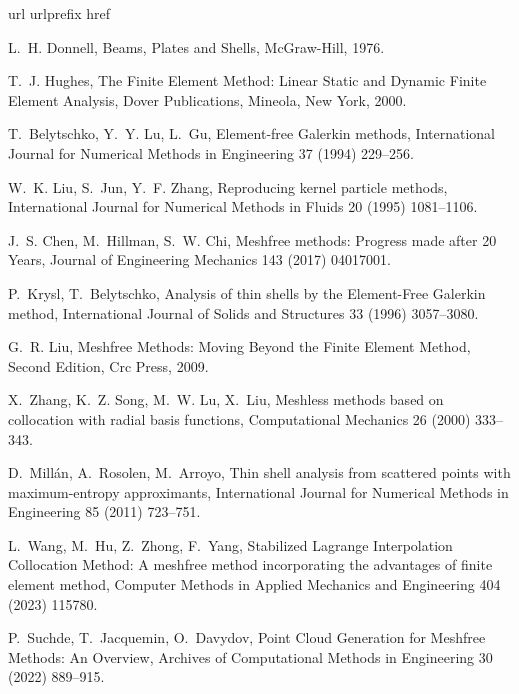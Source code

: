 \documentclass{elsarticle}
\begin{document}
\begin{thebibliography}{10}
\expandafter\ifx\csname url\endcsname\relax
  \def\url#1{\texttt{#1}}\fi
\expandafter\ifx\csname urlprefix\endcsname\relax\def\urlprefix{URL }\fi
\expandafter\ifx\csname href\endcsname\relax
  \def\href#1#2{#2} \def\path#1{#1}\fi

L.~H. Donnell, Beams, {{Plates}} and {{Shells}}, McGraw-Hill, 1976.

T.~J. Hughes, The {{Finite Element Method}}: {{Linear Static}} and {{Dynamic Finite Element Analysis}}, Dover Publications, Mineola, New York, 2000.

T.~Belytschko, Y.~Y. Lu, L.~Gu, Element-free {{Galerkin}} methods, International Journal for Numerical Methods in Engineering 37 (1994) 229--256.

W.~K. Liu, S.~Jun, Y.~F. Zhang, Reproducing kernel particle methods, International Journal for Numerical Methods in Fluids 20 (1995) 1081--1106.

J.~S. Chen, M.~Hillman, S.~W. Chi, {Meshfree methods: Progress made after 20 Years}, Journal of Engineering Mechanics 143 (2017) 04017001.

P.~Krysl, T.~Belytschko, Analysis of thin shells by the {{Element-Free Galerkin}} method, International Journal of Solids and Structures 33 (1996) 3057--3080.

G.~R. Liu, Meshfree {{Methods}}: {{Moving Beyond}} the {{Finite Element Method}}, {{Second Edition}}, Crc Press, 2009.

X.~Zhang, K.~Z. Song, M.~W. Lu, X.~Liu, Meshless methods based on collocation with radial basis functions, Computational Mechanics 26 (2000) 333--343.

D.~Mill{\'a}n, A.~Rosolen, M.~Arroyo, Thin shell analysis from scattered points with maximum-entropy approximants, International Journal for Numerical Methods in Engineering 85 (2011) 723--751.

L.~Wang, M.~Hu, Z.~Zhong, F.~Yang, Stabilized {{Lagrange Interpolation Collocation Method}}: {{A}} meshfree method incorporating the advantages of finite element method, Computer Methods in Applied Mechanics and Engineering 404 (2023) 115780.

P.~Suchde, T.~Jacquemin, O.~Davydov, Point {{Cloud Generation}} for {{Meshfree Methods}}: {{An Overview}}, Archives of Computational Methods in Engineering 30 (2022) 889--915.


\end{thebibliography}
\end{document}
